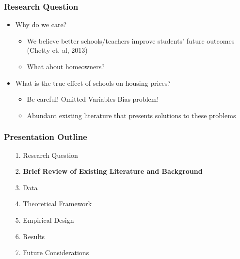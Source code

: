\documentclass{beamer}
\begin{document}
\begin{frame} 
\frametitle{Research Question}
\begin{itemize}
	\item Why do we care?
	\newline
		\begin{itemize}
			\item We believe better schools/teachers improve students' future outcomes (Chetty et. al, 2013)
			\item What about homeowners?
			\newline
		\end{itemize}
	\item What is the true effect of schools on housing prices?
	\newline
		\begin{itemize}
			\item Be careful! Omitted Variables Bias problem!
			\item Abundant existing literature that presents solutions to these problems
		\end{itemize}
\end{itemize}
\end{frame}

\begin{frame}
\label{Presentation Outline 2}
\frametitle{Presentation Outline}
\begin{enumerate}
\item[1.] Research Question
\newline
\item[2.] \textbf{Brief Review of Existing Literature and Background}
\newline
\item[3.] Data
\newline
\item[4.] Theoretical Framework
\newline
\item[5.] Empirical Design
\newline
\item[6.] Results
\newline
\item[7.] Future Considerations
\end{enumerate}
\end{frame}
\end{document}
